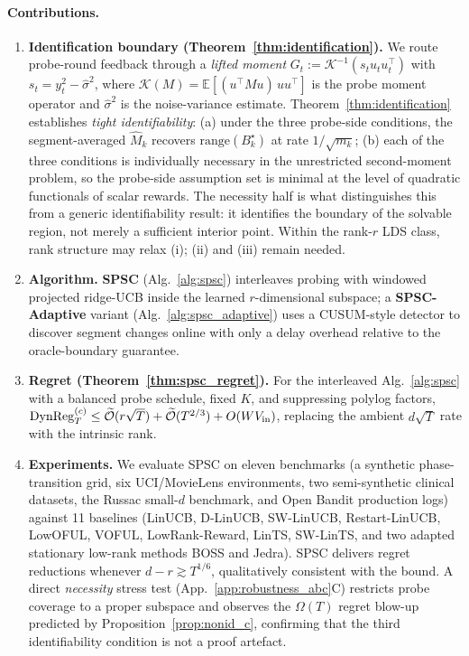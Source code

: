 \documentclass{article}
\newcommand{\E}{\mathbb{E}}
\newcommand{\tilO}{\widetilde{\mathcal{O}}}
\newcommand{\DynReg}{\mathrm{DynReg}}
\newcommand{\range}{\mathrm{range}}
\begin{document}
\paragraph{Contributions.}
\begin{enumerate}[leftmargin=1.5em,itemsep=2pt]
\item \textbf{Identification boundary (Theorem~\ref{thm:identification}).}
We route probe-round feedback through a \emph{lifted moment}
$G_t := \mathcal K^{-1}(s_t u_t u_t^\top)$ with
$s_t = y_t^2 - \widehat\sigma^2$, where $\mathcal K(M)=\E[(u^\top Mu)\,uu^\top]$
is the probe moment operator and $\widehat\sigma^2$ is the
noise-variance estimate. Theorem~\ref{thm:identification} establishes
\emph{tight identifiability}: (a) under the three probe-side
conditions, the segment-averaged $\widehat M_k$ recovers
$\range(B_k^\star)$ at rate $1/\sqrt{m_k}$; (b) each of the three
conditions is individually necessary in the unrestricted
second-moment problem, so the probe-side assumption set is minimal
at the level of quadratic functionals of scalar rewards. The
necessity half is what distinguishes this from a generic
identifiability result: it identifies the boundary of the solvable
region, not merely a sufficient interior point. Within the rank-$r$
LDS class, rank structure may relax (i); (ii) and (iii) remain
needed.
\item \textbf{Algorithm.} \textbf{SPSC} (Alg.~\ref{alg:spsc})
interleaves probing with windowed projected ridge-UCB inside the
learned $r$-dimensional subspace; a \textbf{SPSC-Adaptive} variant
(Alg.~\ref{alg:spsc_adaptive}) uses a CUSUM-style detector to
discover segment changes online with only a delay overhead relative
to the oracle-boundary guarantee.
\item \textbf{Regret (Theorem~\ref{thm:spsc_regret}).} For the
interleaved Alg.~\ref{alg:spsc} with a balanced probe schedule,
fixed $K$, and suppressing polylog factors,
$\DynReg_T^{(c)}\le\tilO(r\sqrt{T})+\tilO(T^{2/3})+O(WV_{\rm in})$,
replacing the ambient $d\sqrt{T}$ rate with the intrinsic rank.
\item \textbf{Experiments.} We evaluate SPSC on eleven benchmarks (a
synthetic phase-transition grid, six UCI/MovieLens environments,
two semi-synthetic clinical datasets, the Russac small-$d$ benchmark,
and Open Bandit production logs) against 11 baselines (LinUCB,
D-LinUCB, SW-LinUCB, Restart-LinUCB, LowOFUL, VOFUL, LowRank-Reward,
LinTS, SW-LinTS, and two adapted stationary low-rank methods BOSS
and Jedra). SPSC delivers regret reductions whenever
$d-r\gtrsim T^{1/6}$, qualitatively consistent with the bound. A
direct \emph{necessity} stress test (App.~\ref{app:robustness_abc}C)
restricts probe coverage to a proper subspace and observes the
$\Omega(T)$ regret blow-up predicted by
Proposition~\ref{prop:nonid_c}, confirming that the third
identifiability condition is not a proof artefact.
\end{enumerate}
\end{document}
